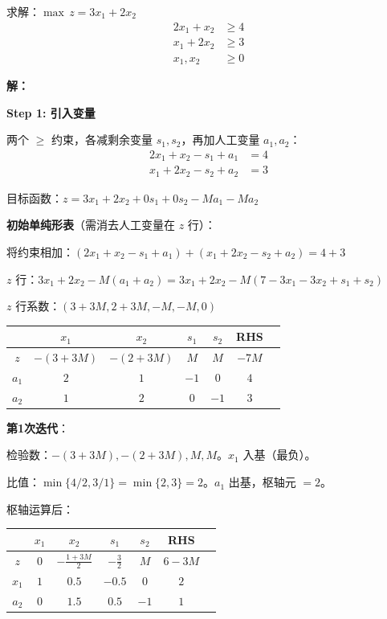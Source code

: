 \begin{example}
求解：$\max \, z = 3x_1 + 2x_2$
\begin{align*}
2x_1 + x_2 &\geq 4 \\
x_1 + 2x_2 &\geq 3 \\
x_1, x_2 &\geq 0
\end{align*}

\textbf{解：}

\textbf{Step 1: 引入变量}

两个 $\geq$ 约束，各减剩余变量 $s_1, s_2$，再加人工变量 $a_1, a_2$：
\begin{align*}
2x_1 + x_2 - s_1 + a_1 &= 4 \\
x_1 + 2x_2 - s_2 + a_2 &= 3
\end{align*}

目标函数：$z = 3x_1 + 2x_2 + 0s_1 + 0s_2 - Ma_1 - Ma_2$

\textbf{初始单纯形表}（需消去人工变量在 $z$ 行）：

将约束相加：$(2x_1+x_2-s_1+a_1) + (x_1+2x_2-s_2+a_2) = 4+3$

$z$ 行：$3x_1 + 2x_2 - M(a_1+a_2) = 3x_1 + 2x_2 - M(7 - 3x_1 - 3x_2 + s_1 + s_2)$

$z$ 行系数：$(3+3M, 2+3M, -M, -M, 0)$

\begin{table}[H]
\centering
\begin{tabular}{@{}c|ccccc|c@{}}
\toprule
& $x_1$ & $x_2$ & $s_1$ & $s_2$ & RHS \\
\midrule
$z$ & $-(3+3M)$ & $-(2+3M)$ & $M$ & $M$ & $-7M$ \\
\midrule
$a_1$ & $2$ & $1$ & $-1$ & $0$ & $4$ \\
$a_2$ & $1$ & $2$ & $0$ & $-1$ & $3$ \\
\bottomrule
\end{tabular}
\end{table}

\textbf{第1次迭代}：

检验数：$-(3+3M), -(2+3M), M, M$。$x_1$ 入基（最负）。

比值：$\min\{4/2, 3/1\} = \min\{2, 3\} = 2$。$a_1$ 出基，枢轴元 $= 2$。

枢轴运算后：

\begin{table}[H]
\centering
\begin{tabular}{@{}c|ccccc|c@{}}
\toprule
& $x_1$ & $x_2$ & $s_1$ & $s_2$ & RHS \\
\midrule
$z$ & $0$ & $-\frac{1+3M}{2}$ & $-\frac{3}{2}$ & $M$ & $6-3M$ \\
\midrule
$x_1$ & $1$ & $0.5$ & $-0.5$ & $0$ & $2$ \\
$a_2$ & $0$ & $1.5$ & $0.5$ & $-1$ & $1$ \\
\bottomrule
\end{tabular}
\end{table}


\end{example}
